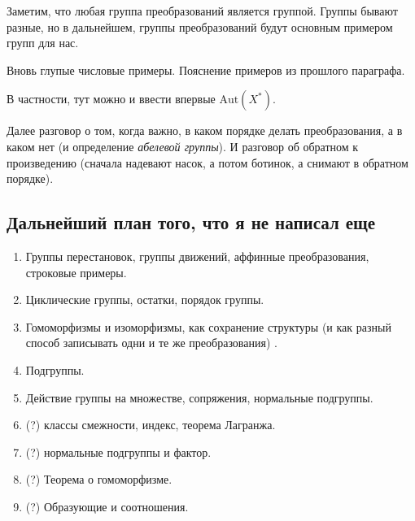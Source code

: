 	\begin{remark}
		Заметим, что любая группа преобразований является группой. Группы бывают разные, но в дальнейшем, группы преобразований будут основным примером групп для нас. 
	\end{remark}

	\begin{example}
		Вновь глупые числовые примеры. Пояснение примеров из прошлого параграфа. 
	\end{example}

	\begin{example}
		В частности, тут можно и ввести впервые $\mathrm{Aut}(X^*)$.
	\end{example}


	Далее разговор о том, когда важно, в каком порядке делать преобразования, а в каком нет (и определение \emph{абелевой группы}). И разговор об обратном к произведению (сначала надевают насок, а потом ботинок, а снимают в обратном порядке). 

	

	\subsection{Дальнейший план того, что я не написал еще}

	\begin{enumerate}
		\item Группы перестановок, группы движений, аффинные преобразования, строковые примеры.  
		\item Циклические группы, остатки, порядок группы. 
		\item Гомоморфизмы и изоморфизмы, как сохранение структуры (и как разный способ записывать одни и те же преобразования) . 
		\item Подгруппы.
		\item Действие группы на множестве, сопряжения, нормальные подгруппы. 

		\item (?) классы смежности, индекс, теорема Лагранжа. 
		\item (?) нормальные подгруппы и фактор. 
		\item (?) Теорема о гомоморфизме. 
		\item (?) Образующие и соотношения. 
	\end{enumerate}

